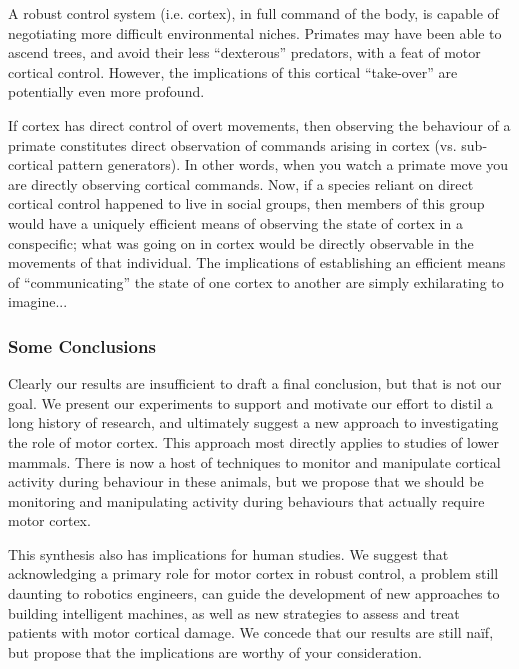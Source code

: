 A robust control system (i.e. cortex), in full command of the body, is capable of negotiating more difficult environmental niches. Primates may have been able to ascend trees, and avoid their less ``dexterous'' predators, with a feat of motor cortical control. However, the implications of this cortical ``take-over'' are potentially even more profound. 

If cortex has direct control of overt movements, then observing the behaviour of a primate constitutes direct observation of commands arising in cortex (vs. sub-cortical pattern generators). In other words, when you watch a primate move you are directly observing cortical commands. Now, if a species reliant on direct cortical control happened to live in social groups, then members of this group would have a uniquely efficient means of observing the state of cortex in a conspecific; what was going on in cortex would be directly observable in the movements of that individual. The implications of establishing an efficient means of ``communicating'' the state of one cortex to another are simply exhilarating to imagine...

\subsubsection*{Some Conclusions}

Clearly our results are insufficient to draft a final conclusion, but that is not our goal. We present our experiments to support and motivate our effort to distil a long history of research, and ultimately suggest a new approach to investigating the role of motor cortex. This approach most directly applies to studies of lower mammals. There is now a host of techniques to monitor and manipulate cortical activity during behaviour in these animals, but we propose that we should be monitoring and manipulating activity during behaviours that actually require motor cortex.

This synthesis also has implications for human studies. We suggest that acknowledging a primary role for motor cortex in robust control, a problem still daunting to robotics engineers, can guide the development of new approaches to building intelligent machines, as well as new strategies to assess and treat patients with motor cortical damage. We concede that our results are still naïf, but propose that the implications are worthy of your consideration.

